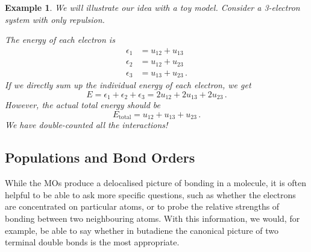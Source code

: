 \documentclass{article}
\theoremstyle{plain}\theoremheaderfont{\normalfont\itshape}\theorembodyfont{\rmfamily}\theoremseparator{.}\newtheorem*{rem}{Remark}\newtheorem*{ex}{Example}\newtheorem*{proof}{Proof}\newtheorem*{altp}{Alternative proof}
\theoremstyle{plain}\theoremheaderfont{\normalfont\bfseries}\theorembodyfont{\rmfamily}\theoremseparator{.}\newtheorem{thm}{Theorem}[section]\newtheorem{lem}[thm]{Lemma}\newtheorem{prop}[thm]{Proposition}\newtheorem*{cor}{Corollary}\newtheorem{defn}[thm]{Definition}\newtheorem{clm}[thm]{Claim}\newtheorem{clminproof}{Claim}\newtheorem{pos}{Postulate}[section]
\theoremstyle{break}\theoremheaderfont{\normalfont\itshape}\theorembodyfont{\rmfamily}\theoremseparator{.\medskip}\newtheorem*{proofskip}{Proof}\newtheorem*{exs}{Examples}\newtheorem*{rems}{Remarks}
\theoremstyle{break}\theoremheaderfont{\normalfont\bfseries}\theorembodyfont{\rmfamily}\theoremseparator{.\medskip}\newtheorem{lemskip}[thm]{Lemma}\newtheorem{defnskip}[thm]{Definition}\newtheorem{propskip}[thm]{Proposition}\newtheorem{thmskip}[thm]{Theorem}
\numberwithin{equation}{section}
\begin{document}
    \begin{ex}
        We will illustrate our idea with a toy model. Consider a 3-electron system with only repulsion.
        \begin{figure}[ht!]
            \centering
        \end{figure}

        The energy of each electron is
        \begin{equation}
            \begin{aligned}
                \epsilon_1&=u_{12}+u_{13}\\
                \epsilon_2&=u_{12}+u_{23}\\
                \epsilon_3&=u_{13}+u_{23}\,.
            \end{aligned}
        \end{equation}
        If we directly sum up the individual energy of each electron, we get
        \begin{equation}
            E=\epsilon_1+\epsilon_2+\epsilon_3=2u_{12}+2u_{13}+2u_{23}\,.
        \end{equation}
        However, the actual total energy should be
        \begin{equation}
            E_{\text{total}}=u_{12}+u_{13}+u_{23}\,.
        \end{equation}
        We have double-counted all the interactions!
    \end{ex}

    \subsection{Populations and Bond Orders}
    While the MOs produce a delocalised picture of bonding in a molecule, it is often helpful to be able to ask more specific questions, such as whether the electrons are concentrated on particular atoms, or to probe the relative strengths of bonding between two neighbouring atoms. With this information, we would, for example, be able to say whether in butadiene the canonical picture of two terminal double bonds is the most appropriate.
\end{document}
